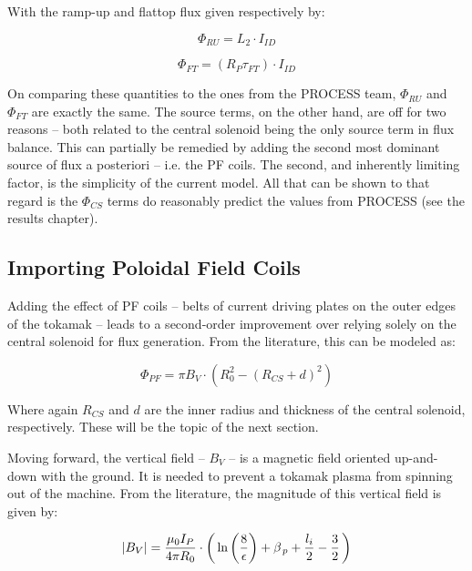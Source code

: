 With the ramp-up and flattop flux given respectively by:

\begin{equation}
	\label{eq:phiru}
	\Phi_{RU} = L_2 \cdot I_{ID}
\end{equation}

\begin{equation}
	\label{eq:phift}
	\Phi_{FT} = ( R_P \tau_{FT} ) \cdot I_{ID}
\end{equation}

On comparing these quantities to the ones from the PROCESS team, $\Phi_{RU}$ and $\Phi_{FT}$ are exactly the same. The source terms, on the other hand, are off for two reasons -- both related to the central solenoid being the only source term in flux balance. This can partially be remedied by adding the second most dominant source of flux a posteriori -- i.e. the PF coils. The second, and inherently limiting factor, is the simplicity of the current model. All that can be shown to that regard is the $\Phi_{CS}$ terms do reasonably predict the values from PROCESS (see the results chapter).

\subsection{Importing Poloidal Field Coils}

Adding the effect of PF coils -- belts of current driving plates on the outer edges of the tokamak -- leads to a second-order improvement over relying solely on the central solenoid for flux generation. From the literature, this can be modeled as:

\begin{equation}
	\label{eq:phipf}
	\Phi_{PF} = \pi B_V \cdot \left( R_0^2 - ( R_{CS} + d ) ^ 2 \right)
\end{equation}

Where again $R_{CS}$ and $d$ are the inner radius and thickness of the central solenoid, respectively. These will be the topic of the next section.

Moving forward, the vertical field -- $B_V$ -- is a magnetic field oriented up-and-down with the ground. It is needed to prevent a tokamak plasma from spinning out of the machine. From the literature, the magnitude of this vertical field is given by:

\begin{equation}
  |B_V| = \frac{\mu_0 I_P}{4 \pi R_0} \cdot \left( \,\textnormal{ln} \left(\frac{8}{\epsilon}\right) + \beta_{\,p} + \frac{l_i}{2} - \frac{3}{2} \, \right)
\end{equation} 

